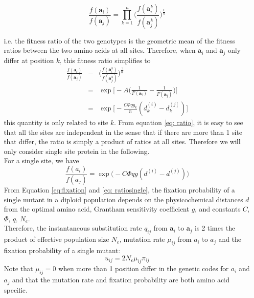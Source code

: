 \documentclass[13pt]{article}
\begin{document}
\begin{equation}
\frac{f(\mathbf{a}_i)}{f(\mathbf{a}_j)} = \prod_{k=1}^n\Big( \frac{f(\mathbf{a}_i^k)}{f(\mathbf{a}_j^k)}\Big)^{\frac{1}{n}}
\end{equation}


i.e. the fitness ratio of the two genotypes is the geometric mean of the fitness ratios between the two amino acids at all sites.
Therefore, when $\mathbf{a}_i$ and $\mathbf{a}_j$ only differ at position $k$, this fitness ratio simplifies to  
\begin{eqnarray}
\frac{f(\mathbf{a}_i)}{f(\mathbf{a}_j)} & = & \Big( \frac{f(\mathbf{a}_i^k)}{f(\mathbf{a}_j^k)}\Big)^{\frac{1}{n}}\\
 & = &\exp \Big[-A\Big( \frac{1}{F(\mathbf{a}_i )} - \frac{1}{F(\mathbf{a}_j )}\Big)\Big] \nonumber\\
& = & \exp\Big[ -\frac{C\Phi q g_k}{n}(d_k^{(i)} - d_k^{(j)})\Big] \label{eq: ratio}
\end{eqnarray}
\noindent
this quantity is only related to site $k$.
From equation \ref{eq: ratio}, it is easy to see that all the sites are independent in the sense that if there are more than 1 site that differ, the ratio is simply a product of ratios at all sites.
Therefore we will only consider single site protein in the following.\\

For a single site, we have 
\begin{equation}
\frac{f(a_i)}{f(a_j)} = \exp\Big(-C\Phi q g(d^{(i)}-d^{(j)})\Big)
\label{eq: ratiosingle}
\end{equation}
From Equation \ref{eq:fixation} and \ref{eq: ratiosingle}, the fixation probability of a single mutant in a diploid population depends on the physicochemical distances $d$ from the optimal amino acid, Grantham sensitivity coefficient $g$, and constants $C$, $\Phi$, $q$, $N_e$.\\


Therefore, the instantaneous substitution rate $q_{ij}$ from $\mathbf{a}_i$ to $\mathbf{a}_j$ is 2 times the product of effective population size $N_e$, mutation rate $\mu_{ij}$ from $a_i$ to $a_j$ and the fixation probability of a single mutant:
\begin{equation}
u_{ij} = 2N_e \mu_{ij} \pi_{ij}
\label{eq:subrate}
\end{equation}
Note that $\mu_{ij} = 0$ when more than 1 position differ in the genetic codes for $a_i$ and $a_j$ and that the mutation rate and fixation probability are both amino acid specific. \\
\end{document}
